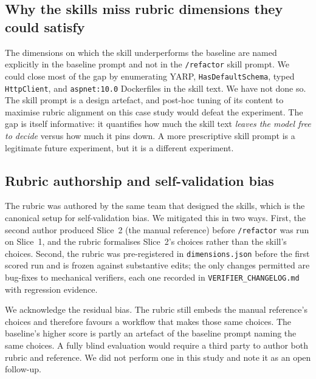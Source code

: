 \documentclass[journal]{IEEEtran}
\begin{document}
\subsection{Why the skills miss rubric dimensions they could satisfy}

The dimensions on which the skill underperforms the baseline are
named explicitly in the baseline prompt and not in the
\texttt{/refactor} skill prompt. We could close most of the gap
by enumerating YARP, \texttt{HasDefaultSchema}, typed
\texttt{HttpClient}, and \texttt{aspnet:10.0} Dockerfiles in the
skill text. We have not done so. The skill prompt is a design
artefact, and post-hoc tuning of its content to maximise rubric
alignment on this case study would defeat the experiment. The
gap is itself informative: it quantifies how much the skill text
\emph{leaves the model free to decide} versus how much it pins
down. A more prescriptive skill prompt is a legitimate future
experiment, but it is a different experiment.

\subsection{Rubric authorship and self-validation bias}

The rubric was authored by the same team that designed the
skills, which is the canonical setup for self-validation bias.
We mitigated this in two ways. First, the second author produced
Slice~2 (the manual reference) before \texttt{/refactor} was run
on Slice~1, and the rubric formalises Slice~2's choices rather
than the skill's choices. Second, the rubric was pre-registered
in \texttt{dimensions.json} before the first scored run and is
frozen against substantive edits; the only changes permitted are
bug-fixes to mechanical verifiers, each one recorded in
\texttt{VERIFIER\_CHANGELOG.md} with regression evidence.

We acknowledge the residual bias. The rubric still embeds the
manual reference's choices and therefore favours a workflow that
makes those same choices. The baseline's higher score is partly
an artefact of the baseline prompt naming the same choices. A
fully blind evaluation would require a third party to author both
rubric and reference. We did not perform one in this study and
note it as an open follow-up.
\end{document}

